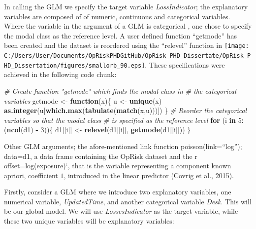 \documentclass[]{DissertateUSU}
\newenvironment{Shaded}{\begin{snugshade}}{\end{snugshade}}
\newcommand{\KeywordTok}[1]{\textcolor[rgb]{0.13,0.29,0.53}{\textbf{#1}}}
\newcommand{\DecValTok}[1]{\textcolor[rgb]{0.00,0.00,0.81}{#1}}
\newcommand{\StringTok}[1]{\textcolor[rgb]{0.31,0.60,0.02}{#1}}
\newcommand{\CommentTok}[1]{\textcolor[rgb]{0.56,0.35,0.01}{\textit{#1}}}
\newcommand{\ControlFlowTok}[1]{\textcolor[rgb]{0.13,0.29,0.53}{\textbf{#1}}}
\newcommand{\OperatorTok}[1]{\textcolor[rgb]{0.81,0.36,0.00}{\textbf{#1}}}
\newcommand{\NormalTok}[1]{#1}
\begin{document}
\singlespacing

\doublespacing

In calling the GLM we specify the target variable \emph{LossIndicator};
the explanatory variables are composed of of numeric, continuous and
categorical variables. Where the variable in the argument of a GLM is
categorical , one chose to specify the modal class as the reference
level. A user defined function ``getmode'' has been created and the
dataset is reordered using the ``relevel'' function in
\texttt{[image: C:/Users/User/Documents/OpRiskPHDGitHub/OpRisk\_PHD\_Dissertate/OpRisk\_PHD\_Dissertation/figures/smallorb\_90.eps]}.
These specifications were achieved in the following code chunk:

\singlespacing

\begin{Shaded}
\begin{Highlighting}[]
\CommentTok{# Create function "getmode" which finds the modal class in}
\CommentTok{# the categorical variables}
\NormalTok{getmode <-}\StringTok{ }\ControlFlowTok{function}\NormalTok{(x)\{}
\NormalTok{  u <-}\StringTok{ }\KeywordTok{unique}\NormalTok{(x)}
  \KeywordTok{as.integer}\NormalTok{(u[}\KeywordTok{which.max}\NormalTok{(}\KeywordTok{tabulate}\NormalTok{(}\KeywordTok{match}\NormalTok{(x,u)))])}
\NormalTok{\}}
\CommentTok{# Reorder the categorical variables so that the modal class }
\CommentTok{# is specified as the reference level}
\ControlFlowTok{for}\NormalTok{ (i }\ControlFlowTok{in} \DecValTok{5}\OperatorTok{:}\NormalTok{(}\KeywordTok{ncol}\NormalTok{(d1) }\OperatorTok{-}\StringTok{ }\DecValTok{3}\NormalTok{))\{}
\NormalTok{     d1[[i]] <-}\StringTok{ }\KeywordTok{relevel}\NormalTok{(d1[[i]], }\KeywordTok{getmode}\NormalTok{(d1[[i]]))}
\NormalTok{\}}
\end{Highlighting}
\end{Shaded}

\doublespacing

Other GLM arguments; the afore-mentioned link function
poisson(link=``log''); data=d1, a data frame containing the OpRisk
dataset and the r offset=log(exposure)`, that is the variable
representing a component known apriori, coefficient \(1\), introduced in
the linear predictor (Covrig et al., 2015).\medskip

Firstly, consider a GLM where we introduce two explanatory variables,
one numerical variable, \emph{UpdatedTime}, and another categorical
variable \emph{Desk}. This will be our global model. We will use
\emph{LossesIndicator} as the target variable, while these two unique
variables will be explanatory variables:
\end{document}
